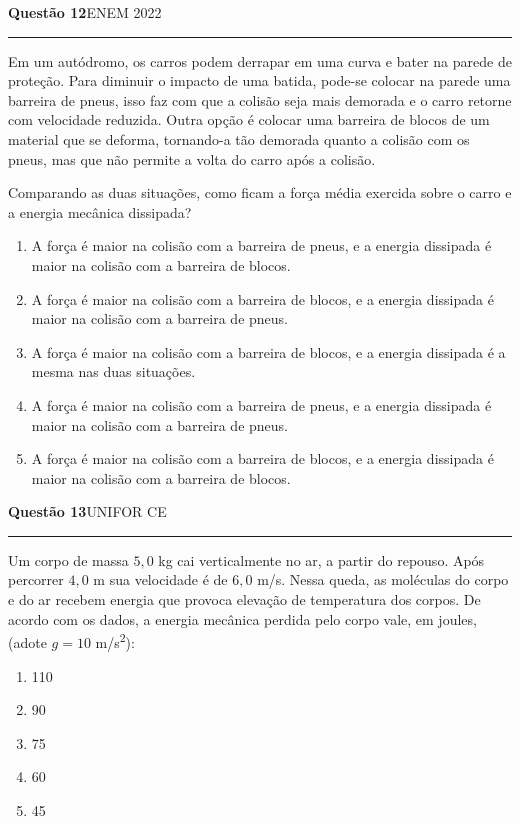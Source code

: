 \documentclass[11pt,a4paper]{article}
\newcommand{\fonte}[1]{{\small\scshape\color{grafite}#1}}
\newenvironment{questao}[2]{%
  \needspace{6\baselineskip}
  \par\addvspace{1.6em}
  {\large\bfseries\color{vinho}Quest\~ao #1}\hfill #2\\[-0.55em]
  {\color{black!25}\rule{\linewidth}{0.4pt}}
  \par\nobreak\smallskip
}{\par\addvspace{0.4em}}
\begin{document}
\begin{questao}{12}{\fonte{ENEM 2022}}
Em um aut\'odromo, os carros podem derrapar em uma curva e bater na
parede de prote\c{c}\~ao. Para diminuir o impacto de uma batida,
pode-se colocar na parede uma barreira de pneus, isso faz com que a
colis\~ao seja mais demorada e o carro retorne com velocidade
reduzida. Outra op\c{c}\~ao \'e colocar uma barreira de blocos de um
material que se deforma, tornando-a t\~ao demorada quanto a
colis\~ao com os pneus, mas que n\~ao permite a volta do carro
ap\'os a colis\~ao.

Comparando as duas situa\c{c}\~oes, como ficam a for\c{c}a m\'edia
exercida sobre o carro e a energia mec\^anica dissipada?
\begin{enumerate}
  \item A for\c{c}a \'e maior na colis\~ao com a barreira de pneus, e
        a energia dissipada \'e maior na colis\~ao com a barreira de
        blocos.
  \item A for\c{c}a \'e maior na colis\~ao com a barreira de blocos, e
        a energia dissipada \'e maior na colis\~ao com a barreira de
        pneus.
  \item A for\c{c}a \'e maior na colis\~ao com a barreira de blocos, e
        a energia dissipada \'e a mesma nas duas situa\c{c}\~oes.
  \item A for\c{c}a \'e maior na colis\~ao com a barreira de pneus, e
        a energia dissipada \'e maior na colis\~ao com a barreira de
        pneus.
  \item A for\c{c}a \'e maior na colis\~ao com a barreira de blocos, e
        a energia dissipada \'e maior na colis\~ao com a barreira de
        blocos.
\end{enumerate}
\end{questao}

\begin{questao}{13}{\fonte{UNIFOR CE}}
Um corpo de massa $5{,}0$ kg cai verticalmente no ar, a partir do
repouso. Ap\'os percorrer $4{,}0$ m sua velocidade \'e de $6{,}0$ m/s.
Nessa queda, as mol\'eculas do corpo e do ar recebem energia que
provoca eleva\c{c}\~ao de temperatura dos corpos. De acordo com os
dados, a energia mec\^anica perdida pelo corpo vale, em joules,
(adote $g = 10$ m/s\textsuperscript{2}):
\begin{enumerate}
  \item 110
  \item 90
  \item 75
  \item 60
  \item 45
\end{enumerate}
\end{questao}
\end{document}
